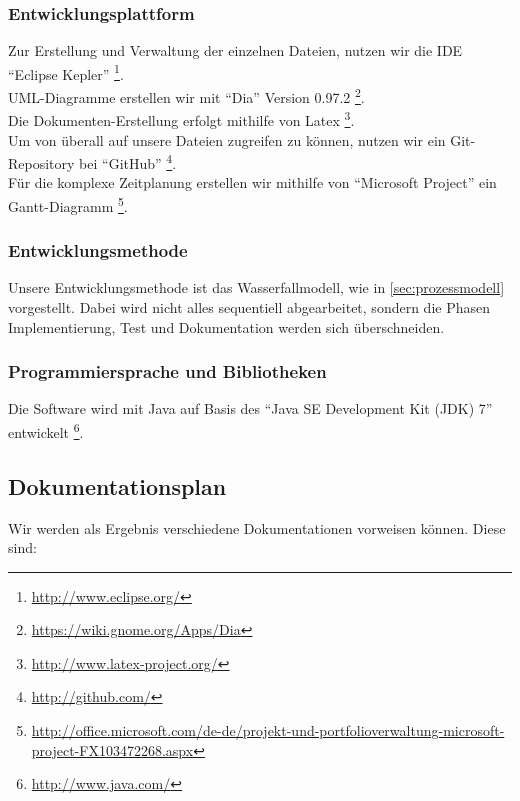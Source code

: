 \documentclass[fontsize=12pt,paper=a4,twoside]{scrartcl}
\begin{document}
\subsubsection{Entwicklungsplattform}
Zur Erstellung und Verwaltung der einzelnen Dateien, nutzen wir die IDE "`Eclipse Kepler"' \footnote{\url{http://www.eclipse.org/}}.\\
UML-Diagramme erstellen wir mit "`Dia"' Version 0.97.2 \footnote{\url{https://wiki.gnome.org/Apps/Dia}}.\\
Die Dokumenten-Erstellung erfolgt mithilfe von Latex \footnote{\url{http://www.latex-project.org/}}.\\
Um von überall auf unsere Dateien zugreifen zu können, nutzen wir ein Git-Repository bei "`GitHub"' \footnote{\url{http://github.com/}}.\\
Für die komplexe Zeitplanung erstellen wir mithilfe von "`Microsoft Project"' ein Gantt-Diagramm \footnote{\url{http://office.microsoft.com/de-de/projekt-und-portfolioverwaltung-microsoft-project-FX103472268.aspx}}.

\subsubsection{Entwicklungsmethode}

Unsere Entwicklungsmethode ist das Wasserfallmodell, wie in \ref{sec:prozessmodell} vorgestellt. Dabei wird nicht alles sequentiell abgearbeitet, sondern die Phasen Implementierung, Test und Dokumentation werden sich überschneiden.

\subsubsection{Programmiersprache und Bibliotheken}

Die Software wird mit Java auf Basis des "`Java SE Development Kit (JDK) 7"' entwickelt \footnote{\url{http://www.java.com/}}.\\

\subsection{Dokumentationsplan}
Wir werden als Ergebnis verschiedene Dokumentationen vorweisen können. Diese sind:
\end{document}
